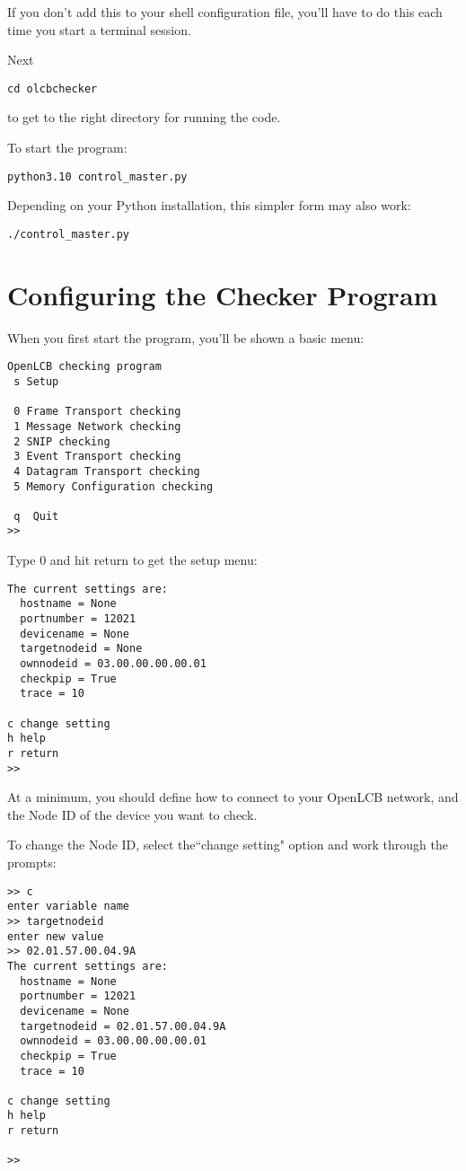\documentclass[11pt]{article}
\begin{document}
If you don't add this to your shell configuration file, you'll have to do 
this each time you start a terminal session.

Next
\begin{verbatim}
cd olcbchecker
\end{verbatim}
to get to the right directory for running the code. 

To start the program:
\begin{verbatim}
python3.10 control_master.py
\end{verbatim}

Depending on your Python installation, this simpler form may also work:
\begin{verbatim}
./control_master.py
\end{verbatim}


\section{Configuring the Checker Program}

When you first start the program, you'll be shown a basic menu:

\begin{verbatim}
OpenLCB checking program
 s Setup

 0 Frame Transport checking
 1 Message Network checking
 2 SNIP checking
 3 Event Transport checking
 4 Datagram Transport checking
 5 Memory Configuration checking
  
 q  Quit
>> 
\end{verbatim}

Type 0 and hit return to get the setup menu:

\begin{verbatim}
The current settings are:
  hostname = None
  portnumber = 12021
  devicename = None
  targetnodeid = None
  ownnodeid = 03.00.00.00.00.01
  checkpip = True
  trace = 10

c change setting
h help
r return
>> 
\end{verbatim}

At a minimum, you should define how to connect to your OpenLCB network,
and the Node ID of the device you want to check.  

To change the Node ID, select the``change setting" option and work through the prompts:

\begin{verbatim}
>> c
enter variable name
>> targetnodeid
enter new value
>> 02.01.57.00.04.9A
The current settings are:
  hostname = None
  portnumber = 12021
  devicename = None
  targetnodeid = 02.01.57.00.04.9A
  ownnodeid = 03.00.00.00.00.01
  checkpip = True
  trace = 10

c change setting
h help
r return

>> 
\end{verbatim}
\end{document}
